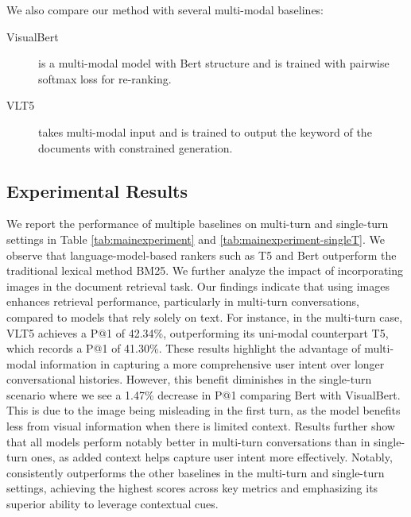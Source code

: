 \documentclass[11pt]{article}
\begin{document}
We also compare our method with several multi-modal baselines:
\begin{description}

    \item [VisualBert] \cite{Li2019VisualBERT} is a multi-modal model with Bert structure and is trained with pairwise softmax loss for re-ranking.
    
    \item [VLT5] \cite{Cho2021VLT5} takes multi-modal input and is trained to output the keyword of the documents with constrained generation.
   
\end{description}





\subsection{Experimental Results}
We report the performance of multiple baselines on multi-turn and single-turn settings in Table \ref{tab:mainexperiment} and \ref{tab:mainexperiment-singleT}. We observe that language-model-based rankers such as T5 and Bert outperform the traditional lexical method BM25. 
We further analyze the impact of incorporating images in the document retrieval task. Our findings indicate that using images enhances retrieval performance, particularly in multi-turn conversations, compared to models that rely solely on text. For instance, in the multi-turn case, VLT5 achieves a P@1 of 42.34\%, outperforming its uni-modal counterpart T5, which records a P@1 of 41.30\%. These results highlight the advantage of multi-modal information in capturing a more comprehensive user intent over longer conversational histories. However, this benefit diminishes in the single-turn scenario where we see a 1.47\% decrease in P@1 comparing Bert with VisualBert. This is due to the image being misleading in the first turn, as the model benefits less from visual information when there is limited context.
Results further show that all models perform notably better in multi-turn conversations than in single-turn ones, as added context helps capture user intent more effectively.
Notably, \OurModel{} consistently outperforms the other baselines in the multi-turn and single-turn settings, achieving the highest scores across key metrics and emphasizing its superior ability to leverage contextual cues. 
\end{document}
